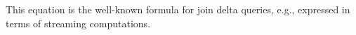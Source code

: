 \begin{theorem}[Bilinear]
\begin{tabular}{m{3.3cm}m{0cm}m{4cm}}
\end{tabular}
\end{theorem}

This equation is the well-known formula for join delta queries,
e.g.,\cite{koch-pods10} expressed in terms of streaming computations.

